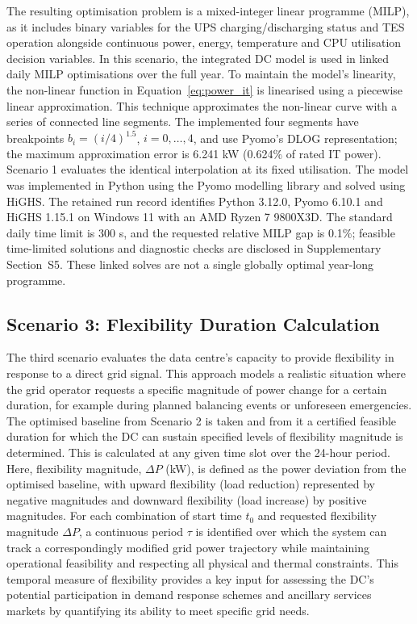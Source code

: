 \documentclass[lettersize,journal]{IEEEtran}
\newcommand{\rev}[1]{#1}
\begin{document}
\rev{The resulting optimisation problem is a mixed-integer linear programme (MILP), as it includes binary variables for the UPS charging/discharging status and TES operation alongside continuous power, energy, temperature and CPU utilisation decision variables.} In this scenario, the integrated DC model is used in linked daily MILP optimisations over the full year. To maintain the model's linearity, the non-linear function in Equation~\eqref{eq:power_it} is linearised using a piecewise linear approximation. This technique approximates the non-linear curve with a series of connected line segments. The implemented four segments have breakpoints $b_i=(i/4)^{1.5}$, $i=0,\ldots,4$, and use Pyomo's DLOG representation; the maximum approximation error is 6.241 kW (0.624\% of rated IT power). Scenario 1 evaluates the identical interpolation at its fixed utilisation. The model was implemented in Python using the Pyomo modelling library and solved using HiGHS. The retained run record identifies Python 3.12.0, Pyomo 6.10.1 and HiGHS 1.15.1 on Windows 11 with an AMD Ryzen 7 9800X3D. The standard daily time limit is 300 s, and the requested relative MILP gap is 0.1\%; feasible time-limited solutions and diagnostic checks are disclosed in Supplementary Section~S5. These linked solves are not a single globally optimal year-long programme.





\subsection{Scenario 3: Flexibility Duration Calculation}\label{sec:scenario 3}
The third scenario evaluates the data centre's capacity to provide flexibility in response to a direct grid signal. This approach models a realistic situation where the grid operator requests a specific magnitude of power change for a certain duration, for example during planned balancing events or unforeseen emergencies. The optimised baseline from Scenario 2 is taken and from it a certified feasible duration for which the DC can sustain specified levels of flexibility magnitude is determined. This is calculated at any given time slot over the 24-hour period. Here, flexibility magnitude, $\Delta P$ (kW), is defined as the power deviation from the optimised baseline, with upward flexibility (load reduction) represented by negative magnitudes and downward flexibility (load increase) by positive magnitudes. For each combination of start time $t_0$ and requested flexibility magnitude $\Delta P$, a continuous period $\tau$ is identified over which the system can track a correspondingly modified grid power trajectory while maintaining operational feasibility and respecting all physical and thermal constraints. This temporal measure of flexibility provides a key input for assessing the DC's potential participation in demand response schemes and ancillary services markets by quantifying its ability to meet specific grid needs.
\end{document}
